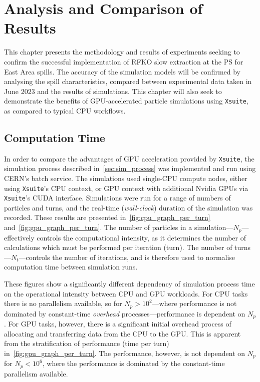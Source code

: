 \documentclass[a4paper,twoside,11pt]{report}
\begin{document}
\chapter{Analysis and Comparison of Results}\label{chap:results}
This chapter presents the methodology and results of experiments seeking to confirm the successful implementation of RFKO slow extraction at the PS for East Area spills. The accuracy of the simulation models will be confirmed by analysing the spill characteristics, compared between experimental data taken in June 2023 and the results of simulations. This chapter will also seek to demonstrate the benefits of GPU-accelerated particle simulations using \verb|Xsuite|, as compared to typical CPU workflows.


\section{Computation Time}

In order to compare the advantages of GPU acceleration provided by \verb|Xsuite|, the simulation process described in~\autoref{sec:sim_process} was implemented and run using CERN's batch service. The simulations used single-CPU compute nodes, either using \verb|Xsuite|'s CPU context, or GPU context with additional Nvidia GPUs via \verb|Xsuite|'s CUDA interface. Simulations were run for a range of numbers of particles and turns, and the real-time (\textit{wall-clock}) duration of the simulation was recorded. These results are presented in~\autoref{fig:cpu_graph_per_turn} and~\autoref{fig:gpu_graph_per_turn}. The number of particles in a simulation---$N_p$---effectively controls the computational intensity, as it determines the number of calculations which must be performed per iteration (turn). The number of turns---$N_t$---controls the number of iterations, and is therefore used to normalise computation time between simulation runs.

These figures show a significantly different dependency of simulation process time on the operational intensity between CPU and GPU workloads. For CPU tasks there is no parallelism available, so for $N_p>10^2$---where performance is not dominated by constant-time \textit{overhead} processes---performance is dependent on $N_p$. For GPU tasks, however, there is a significant initial overhead process of allocating and transferring data from the CPU to the GPU. This is apparent from the stratification of performance (time per turn) in~\autoref{fig:gpu_graph_per_turn}. The performance, however, is not dependent on $N_p$ for $N_p<10^6$, where the performance is dominated by the constant-time parallelism available.
\end{document}
